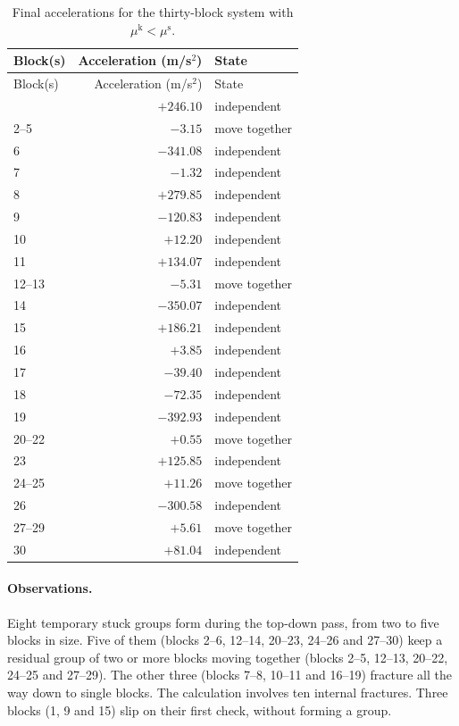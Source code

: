 \documentclass[11pt,a4paper]{article}
\begin{document}
\begin{longtable}{@{}lrl@{}}
\caption{Final accelerations for the thirty-block system with $\mu^{\mathrm k}<\mu^{\mathrm s}$.}\label{tab:result30}\\
\toprule
Block(s) & Acceleration (m/s$^2$) & State\\
\midrule
\endfirsthead
\toprule
Block(s) & Acceleration (m/s$^2$) & State\\
\midrule
\endhead
\bottomrule
\endlastfoot
1 & $+246.10$ & independent \\
2--5 & $-3.15$ & move together \\
6 & $-341.08$ & independent \\
7 & $-1.32$ & independent \\
8 & $+279.85$ & independent \\
9 & $-120.83$ & independent \\
10 & $+12.20$ & independent \\
11 & $+134.07$ & independent \\
12--13 & $-5.31$ & move together \\
14 & $-350.07$ & independent \\
15 & $+186.21$ & independent \\
16 & $+3.85$ & independent \\
17 & $-39.40$ & independent \\
18 & $-72.35$ & independent \\
19 & $-392.93$ & independent \\
20--22 & $+0.55$ & move together \\
23 & $+125.85$ & independent \\
24--25 & $+11.26$ & move together \\
26 & $-300.58$ & independent \\
27--29 & $+5.61$ & move together \\
30 & $+81.04$ & independent \\
\end{longtable}


\paragraph{Observations.} Eight temporary stuck groups form during the top-down pass, from two to five blocks in size. Five of them (blocks 2--6, 12--14, 20--23, 24--26 and 27--30) keep a residual group of two or more blocks moving together (blocks 2--5, 12--13, 20--22, 24--25 and 27--29). The other three (blocks 7--8, 10--11 and 16--19) fracture all the way down to single blocks. The calculation involves ten internal fractures. Three blocks (1, 9 and 15) slip on their first check, without forming a group.
\end{document}
